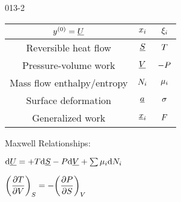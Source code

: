 \begin{mitframe}{013-2}

    

\begin{longtable}{ | c | c | c | } 
 \hline
 	$ y^{(0)}= \uline{\intenergy}$& $\conjcoor$ & $\conjcoortwo_{\state}$ \\ \hline
	Reversible heat flow & $\uline{\entropy}$ & $\Temp$ \\ \hline 
	Pressure-volume work & $\uline{\vol}$ & $-\p$  \\ \hline
 	Mass flow enthalpy/entropy& $\nummoles_{\state}$ & $\chempot_{\state}$ \\ \hline   
	Surface deformation & $\totalsa$ & $\surftens$ \\ \hline   
    Generalized work & $\gendisp_{\state}$ & $\force$ \\ \hline
 
 
\end{longtable}

    
    
\begin{listone}
        
    \item Maxwell Relationships:
        
    \item $\mathrm{d}\uline{\intenergy} = +\Temp\mathrm{d}\uline{\entropy} - \p\mathrm{d}\uline{\vol} + \sum\nolimits\chempot_{\state}\mathrm{d}\nummoles_{\state}$
         
    \item $\bigg(\dfrac{\partial\Temp}{\partial\vol}\bigg)_{\entropy} = -\bigg(\dfrac{\partial\p}{\partial\entropy}\bigg)_{\vol}$
    
\end{listone}			

\end{mitframe}